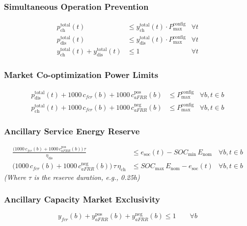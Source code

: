 \documentclass[11pt, a4paper]{article}
\begin{document}
\subsubsection{Simultaneous Operation Prevention}
\begin{align}
p^{\mathrm{total}}_{\mathrm{ch}}(t) &\le y^{\mathrm{total}}_{\mathrm{ch}}(t) \cdot P^{\mathrm{config}}_{\max} & \forall t \\
p^{\mathrm{total}}_{\mathrm{dis}}(t) &\le y^{\mathrm{total}}_{\mathrm{dis}}(t) \cdot P^{\mathrm{config}}_{\max} & \forall t \\
y^{\mathrm{total}}_{\mathrm{ch}}(t) + y^{\mathrm{total}}_{\mathrm{dis}}(t) &\le 1 & \forall t
\end{align}

\subsubsection{Market Co-optimization Power Limits}
\begin{align}
p^{\mathrm{total}}_{\mathrm{dis}}(t) + 1000\,c_{fcr}(b) + 1000\,c^{\mathrm{pos}}_{aFRR}(b) &\le P^{\mathrm{config}}_{\max} & \forall b, t \in b \\
p^{\mathrm{total}}_{\mathrm{ch}}(t) + 1000\,c_{fcr}(b) + 1000\,c^{\mathrm{neg}}_{aFRR}(b) &\le P^{\mathrm{config}}_{\max} & \forall b, t \in b
\end{align}

\subsubsection{Ancillary Service Energy Reserve}
\begin{align}
    \frac{\big(1000\,c_{fcr}(b) + 1000\,c^{\mathrm{pos}}_{aFRR}(b)\big)\,\tau}{\eta_{\mathrm{dis}}} &\leq e_{\mathrm{soc}}(t) - SOC_{\min}\,E_{\mathrm{nom}} & \forall b, t \in b \\
    \big(1000\,c_{fcr}(b) + 1000\,c^{\mathrm{neg}}_{aFRR}(b)\big)\,\tau\,\eta_{\mathrm{ch}} &\leq SOC_{\max}\,E_{\mathrm{nom}} - e_{\mathrm{soc}}(t) & \forall b, t \in b
\end{align}
\textit{(Where $\tau$ is the reserve duration, e.g., 0.25h)}

\subsubsection{Ancillary Capacity Market Exclusivity}
\begin{equation}
    y_{fcr}(b) + y^{\mathrm{pos}}_{aFRR}(b) + y^{\mathrm{neg}}_{aFRR}(b) \le 1 \qquad \forall b
\end{equation}
\end{document}
